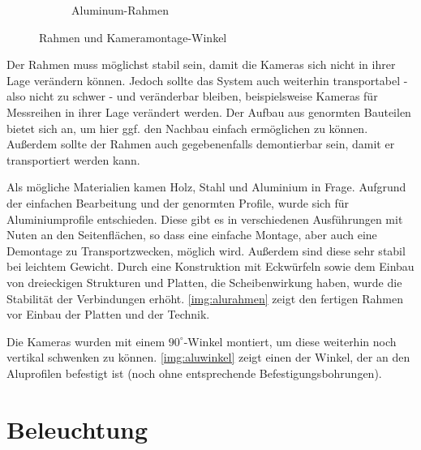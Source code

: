 \documentclass[./00PhotoBox.tex]{subfiles}
\begin{document}
\begin{figure}
\begin{subfigure}{0.45\textwidth}
        \centering
        \caption{Aluminum-Rahmen} %
        \label{img:alurahmen} %
    \end{subfigure}
    \caption{Rahmen und Kameramontage-Winkel} %
\end{figure}

Der Rahmen muss möglichst stabil sein, damit die Kameras sich nicht in ihrer Lage verändern können. Jedoch sollte das System auch weiterhin transportabel - also nicht zu schwer - und veränderbar bleiben, beispielsweise Kameras für Messreihen in ihrer Lage verändert werden. Der Aufbau aus genormten Bauteilen bietet sich an, um hier ggf. den Nachbau einfach ermöglichen zu können. Außerdem sollte der Rahmen auch gegebenenfalls demontierbar sein, damit er transportiert werden kann.

Als mögliche Materialien kamen Holz, Stahl und Aluminium in Frage. Aufgrund der einfachen Bearbeitung und der genormten Profile, wurde sich für Aluminiumprofile entschieden. Diese gibt es in verschiedenen Ausführungen mit Nuten an den Seitenflächen, so dass eine einfache Montage, aber auch eine Demontage zu Transportzwecken, möglich wird. Außerdem sind diese sehr stabil bei leichtem Gewicht. Durch eine Konstruktion mit Eckwürfeln sowie dem Einbau von dreieckigen Strukturen und Platten, die Scheibenwirkung haben, wurde die Stabilität der Verbindungen erhöht. \autoref{img:alurahmen} zeigt den fertigen Rahmen vor Einbau der Platten und der Technik.

Die Kameras wurden mit einem $90^\circ$-Winkel montiert, um diese weiterhin noch vertikal schwenken zu können. \autoref{img:aluwinkel} zeigt einen der Winkel, der an den Aluprofilen befestigt ist (noch ohne entsprechende Befestigungsbohrungen).


\section{Beleuchtung}
\end{document}
